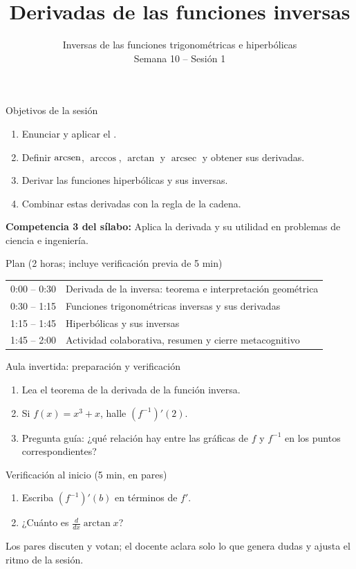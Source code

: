 \documentclass[10pt,aspectratio=169]{beamer}
\title[Derivadas de funciones inversas]{Derivadas de las funciones inversas}
\subtitle{Inversas de las funciones trigonométricas e hiperbólicas\\[2pt]\small Semana 10 -- Sesión 1}
\begin{document}
\begin{frame}
  \titlepage
\end{frame}

\begin{frame}{Objetivos de la sesión}
  \begin{enumerate}
    \item Enunciar y aplicar el .
    \item Definir $\operatorname{arcsen}$, $\arccos$, $\arctan$ y $\operatorname{arcsec}$ y obtener sus derivadas.
    \item Derivar las funciones hiperbólicas y sus inversas.
    \item Combinar estas derivadas con la regla de la cadena.
  \end{enumerate}
  \vspace{1mm}
  {\small\textbf{Competencia 3 del sílabo:} Aplica la derivada y su utilidad en problemas de ciencia e ingeniería.}
  \begin{block}{Plan (2 horas; incluye verificación previa de 5 min)}
    \begin{tabular}{ll}
      0:00 -- 0:30 & Derivada de la inversa: teorema e interpretación geométrica\\
      0:30 -- 1:15 & Funciones trigonométricas inversas y sus derivadas\\
      1:15 -- 1:45 & Hiperbólicas y sus inversas\\
      1:45 -- 2:00 & Actividad colaborativa, resumen y cierre metacognitivo
    \end{tabular}
  \end{block}
\end{frame}

\begin{frame}{Aula invertida: preparación y verificación}
  \small
  \begin{previa}
    \begin{enumerate}
      \item Lea el teorema de la derivada de la función inversa.
      \item Si $f(x)=x^3+x$, halle $(f^{-1})'(2)$.
      \item Pregunta guía: ¿qué relación hay entre las gráficas de $f$ y $f^{-1}$ en los puntos correspondientes?
    \end{enumerate}
  \end{previa}
  \begin{block}{Verificación al inicio (5 min, en pares)}
    \begin{enumerate}
      \item Escriba $(f^{-1})'(b)$ en términos de $f'$.
      \item ¿Cuánto es $\frac{d}{dx}\arctan x$?
    \end{enumerate}
    Los pares discuten y votan; el docente aclara solo lo que genera dudas y ajusta el ritmo de la sesión.
  \end{block}
\end{frame}
\end{document}
